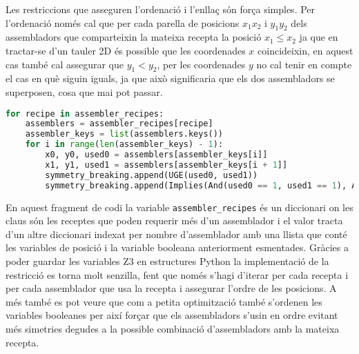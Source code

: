 Les restriccions que asseguren l'ordenació i l'enllaç són força simples. Per l'ordenació només cal que per cada parella de posicions $x_1 x_2$ i $y_1 y_2$ dels assembladors que comparteixin la mateixa recepta la posició $x_1 \leq x_2$ ja que en tractar-se d'un tauler 2D és possible que les coordenades $x$ coincideixin, en aquest cas també cal assegurar que $y_1 < y_2$, per les coordenades $y$ no cal tenir en compte el cas en què siguin iguals, ja que això significaria que els dos assembladors se superposen, cosa que mai pot passar.

\begin{lstlisting}[language=Python, caption=Posicions ordenades]
for recipe in assembler_recipes:
    assemblers = assembler_recipes[recipe]
    assembler_keys = list(assemblers.keys())
    for i in range(len(assembler_keys) - 1):
        x0, y0, used0 = assemblers[assembler_keys[i]]
        x1, y1, used1 = assemblers[assembler_keys[i + 1]]
        symmetry_breaking.append(UGE(used0, used1))
        symmetry_breaking.append(Implies(And(used0 == 1, used1 == 1), And(ULE(x0, x1), Implies(x0 == x1, ULT(y0, y1)))))
\end{lstlisting}

En aquest fragment de codi la variable \lstinline{assembler_recipes} és un diccionari on les claus són les receptes que poden requerir més d'un assemblador i el valor tracta d'un altre diccionari indexat per nombre d'assemblador amb una llista que conté les variables de posició i la variable booleana anteriorment esmentades. Gràcies a poder guardar les variables Z3 en estructures Python la implementació de la restricció es torna molt senzilla, fent que només s'hagi d'iterar per cada recepta i per cada assemblador que usa la recepta i assegurar l'ordre de les posicions. A més també es pot veure que com a petita optimització també s'ordenen les variables booleanes per així forçar que els assembladors s'usin en ordre evitant més simetries degudes a la possible combinació d'assembladors amb la mateixa recepta.\\

